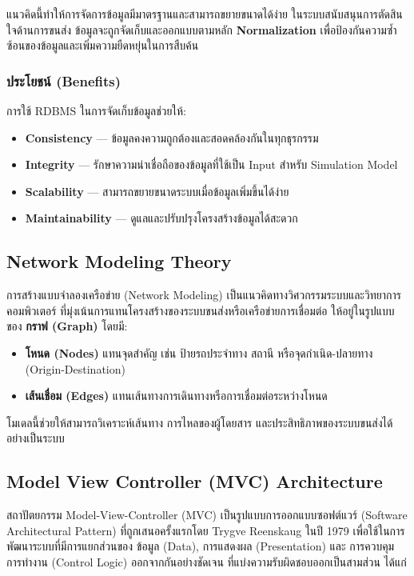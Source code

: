 แนวคิดนี้ทำให้การจัดการข้อมูลมีมาตรฐานและสามารถขยายขนาดได้ง่าย
ในระบบสนับสนุนการตัดสินใจด้านการขนส่ง
ข้อมูลจะถูกจัดเก็บและออกแบบตามหลัก \textbf{Normalization} 
เพื่อป้องกันความซ้ำซ้อนของข้อมูลและเพิ่มความยืดหยุ่นในการสืบค้น

\subsubsection{ประโยชน์ (Benefits)}
การใช้ RDBMS ในการจัดเก็บข้อมูลช่วยให้:
\begin{itemize}
    \item \textbf{Consistency} — ข้อมูลคงความถูกต้องและสอดคล้องกันในทุกธุรกรรม
    \item \textbf{Integrity} — รักษาความน่าเชื่อถือของข้อมูลที่ใช้เป็น Input สำหรับ Simulation Model
    \item \textbf{Scalability} — สามารถขยายขนาดระบบเมื่อข้อมูลเพิ่มขึ้นได้ง่าย
    \item \textbf{Maintainability} — ดูแลและปรับปรุงโครงสร้างข้อมูลได้สะดวก
\end{itemize}

\subsection{Network Modeling Theory}
การสร้างแบบจำลองเครือข่าย (Network Modeling) เป็นแนวคิดทางวิศวกรรมระบบและวิทยาการคอมพิวเตอร์ 
ที่มุ่งเน้นการแทนโครงสร้างของระบบขนส่งหรือเครือข่ายการเชื่อมต่อ 
ให้อยู่ในรูปแบบของ \textbf{กราฟ (Graph)} โดยมี:
\begin{itemize}
    \item \textbf{โหนด (Nodes)} แทนจุดสำคัญ เช่น ป้ายรถประจำทาง สถานี หรือจุดกำเนิด-ปลายทาง (Origin-Destination)
    \item \textbf{เส้นเชื่อม (Edges)} แทนเส้นทางการเดินทางหรือการเชื่อมต่อระหว่างโหนด
\end{itemize}
โมเดลนี้ช่วยให้สามารถวิเคราะห์เส้นทาง การไหลของผู้โดยสาร และประสิทธิภาพของระบบขนส่งได้อย่างเป็นระบบ


\subsection{Model View Controller (MVC) Architecture}

สถาปัตยกรรม Model-View-Controller (MVC) เป็นรูปแบบการออกแบบซอฟต์แวร์ (Software Architectural Pattern) 
ที่ถูกเสนอครั้งแรกโดย Trygve Reenskaug ในปี 1979 เพื่อใช้ในการพัฒนาระบบที่มีการแยกส่วนของ 
ข้อมูล (Data), การแสดงผล (Presentation) และ การควบคุมการทำงาน (Control Logic) ออกจากกันอย่างชัดเจน
ที่แบ่งความรับผิดชอบออกเป็นสามส่วน ได้แก่ 

